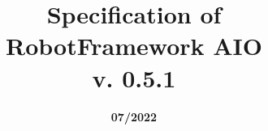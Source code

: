 
\title{\textbf{Specification of \\
\vspace{2ex}
RobotFramework AIO \\
\vspace{2ex}
v. 0.5.1}}

\date{\vspace{4ex}\textbf{07/2022}}

